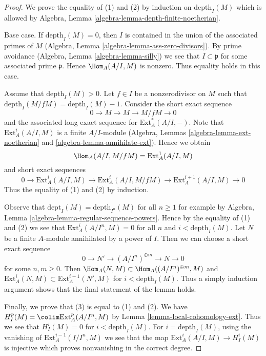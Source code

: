 \begin{proof}
We prove the equality of (1) and (2) by induction on $\text{depth}_I(M)$
which is allowed by
Algebra, Lemma \ref{algebra-lemma-depth-finite-noetherian}.

\medskip\noindent
Base case. If $\text{depth}_I(M) = 0$, then $I$ is contained in the union
of the associated primes of $M$
(Algebra, Lemma \ref{algebra-lemma-ass-zero-divisors}).
By prime avoidance (Algebra, Lemma \ref{algebra-lemma-silly})
we see that $I \subset \mathfrak p$ for some associated prime $\mathfrak p$.
Hence $\Hom_A(A/I, M)$
is nonzero. Thus equality holds in this case.

\medskip\noindent
Assume that $\text{depth}_I(M) > 0$. Let $f \in I$ be a nonzerodivisor
on $M$ such that $\text{depth}_I(M/fM) = \text{depth}_I(M) - 1$.
Consider the short exact sequence
$$
0 \to M \to M \to M/fM \to 0
$$
and the associated long exact sequence for $\text{Ext}^*_A(A/I, -)$.
Note that $\text{Ext}^i_A(A/I, M)$ is a finite $A/I$-module
(Algebra, Lemmas \ref{algebra-lemma-ext-noetherian} and
\ref{algebra-lemma-annihilate-ext}). Hence we obtain
$$
\Hom_A(A/I, M/fM) = \text{Ext}^1_A(A/I, M)
$$
and short exact sequences
$$
0 \to \text{Ext}^i_A(A/I, M) \to \text{Ext}^i_A(A/I, M/fM) \to
\text{Ext}^{i + 1}_A(A/I, M) \to 0
$$
Thus the equality of (1) and (2) by induction.

\medskip\noindent
Observe that $\text{dept}_I(M) = \text{depth}_{I^n}(M)$ for all $n \geq 1$
for example by Algebra, Lemma \ref{algebra-lemma-regular-sequence-powers}.
Hence by the equality of (1) and (2) we see that
$\text{Ext}^i_A(A/I^n, M) = 0$ for all $n$ and $i < \text{depth}_I(M)$.
Let $N$ be a finite $A$-module annihilated by a power of $I$.
Then we can choose a short exact sequence
$$
0 \to N' \to (A/I^n)^{\oplus m} \to N \to 0
$$
for some $n, m \geq 0$. Then
$\Hom_A(N, M) \subset \Hom_A((A/I^n)^{\oplus m}, M)$
and
$\text{Ext}^i_A(N, M) \subset \text{Ext}^{i - 1}_A(N', M)$
for $i < \text{depth}_I(M)$. Thus a simply induction argument
shows that the final statement of the lemma holds.

\medskip\noindent
Finally, we prove that (3) is equal to (1) and (2).
We have $H^p_I(M) = \colim \text{Ext}^p_A(A/I^n, M)$ by
Lemma \ref{lemma-local-cohomology-ext}.
Thus we see that $H^i_I(M) = 0$ for $i < \text{depth}_I(M)$.
For $i = \text{depth}_I(M)$, using the vanishing of
$\text{Ext}_A^{i - 1}(I/I^n, M)$ we see that the map
$\text{Ext}_A^i(A/I, M) \to H_I^i(M)$ is injective which
proves nonvanishing in the correct degree.
\end{proof}

